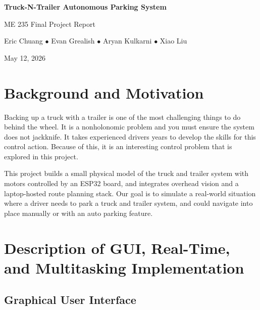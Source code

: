 \documentclass[11pt, letterpaper]{article}
\begin{document}
\begin{titlepage}
  \centering
  \vspace*{3.5cm}
  {\Huge\bfseries Truck-N-Trailer Autonomous Parking System\par}
  \vspace{1.2cm}
  {\large ME 235 Final Project Report\par}
  \vspace{1.8cm}
  {\normalsize
    Eric Chuang \enspace$\bullet$\enspace
    Evan Grealish \enspace$\bullet$\enspace
    Aryan Kulkarni \enspace$\bullet$\enspace
    Xiao Liu\par}
  \vspace{0.6cm}
  {\normalsize May 12, 2026\par}
\end{titlepage}

\section{Background and Motivation}

Backing up a truck with a trailer is one of the most challenging things
to do behind the wheel. It is a nonholonomic problem and you must ensure
the system does not jackknife. It takes experienced drivers years to
develop the skills for this control action. Because of this, it is an
interesting control problem that is explored in this project.

This project builds a small physical model of the truck and trailer
system with motors controlled by an ESP32 board, and integrates overhead
vision and a laptop-hosted route planning stack. Our goal is to simulate
a real-world situation where a driver needs to park a truck and trailer
system, and could navigate into place manually or with an auto parking
feature.

\section{Description of GUI, Real-Time, and Multitasking Implementation}

\subsection{Graphical User Interface}
\end{document}
